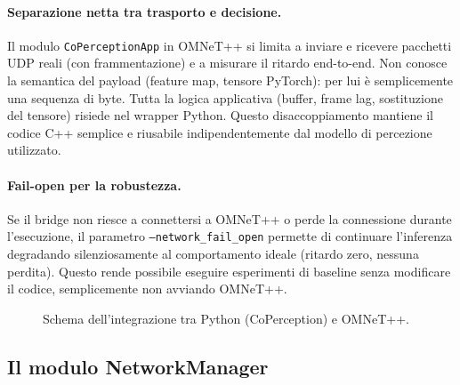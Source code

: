 \documentclass[12pt,a4paper]{article}
\begin{document}
\paragraph{Separazione netta tra trasporto e decisione.}
Il modulo \texttt{CoPerceptionApp} in OMNeT++ si limita a inviare e ricevere pacchetti
UDP reali (con frammentazione) e a misurare il ritardo end-to-end. Non conosce la
semantica del payload (feature map, tensore PyTorch): per lui \`e semplicemente una
sequenza di byte. Tutta la logica applicativa (buffer, frame lag, sostituzione del
tensore) risiede nel wrapper Python. Questo disaccoppiamento mantiene il codice C++
semplice e riusabile indipendentemente dal modello di percezione utilizzato.

\paragraph{Fail-open per la robustezza.}
Se il bridge non riesce a connettersi a OMNeT++ o perde la connessione durante
l'esecuzione, il parametro \texttt{--network\_fail\_open} permette di continuare
l'inferenza degradando silenziosamente al comportamento ideale (ritardo zero, nessuna
perdita). Questo rende possibile eseguire esperimenti di baseline senza modificare
il codice, semplicemente non avviando OMNeT++.

\begin{figure}[H]
  \centering
  \caption{Schema dell'integrazione tra Python (CoPerception) e OMNeT++.}
  \label{fig:arch}
\end{figure}

\subsection{Il modulo NetworkManager}
\end{document}
